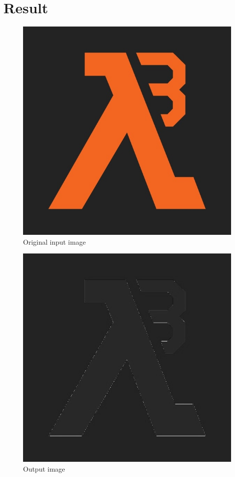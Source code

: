 \documentclass{article}
\begin{document}
\section*{Result}
\begin{figure}[h]
\center\includegraphics[scale=0.3]{../labwork/data/hl3.jpg}
\caption{Original input image}
\end{figure}
\begin{figure}[h]
\center\includegraphics[scale=0.3]{../labwork/build/labwork4-gpu-out.jpg}
\caption{Output image}
\end{figure}
\end{document}
